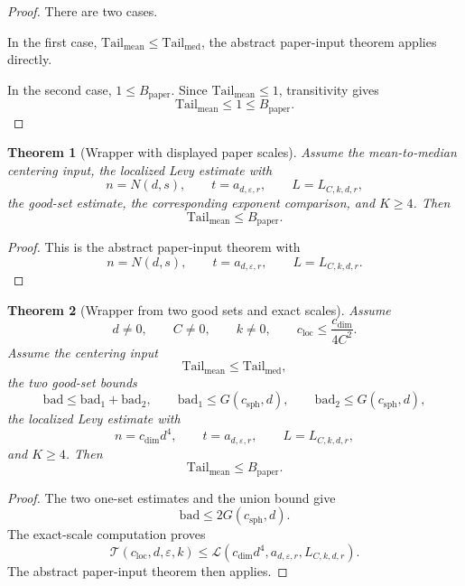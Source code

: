 \documentclass[11pt]{article}
\newtheorem{theorem}{Theorem}[section]
\begin{document}
\begin{proof}
There are two cases.

In the first case,
\(\mathrm{Tail}_{\mathrm{mean}}\le \mathrm{Tail}_{\mathrm{med}}\), the
abstract paper-input theorem applies directly.

In the second case, \(1\le B_{\mathrm{paper}}\).  Since
\(\mathrm{Tail}_{\mathrm{mean}}\le1\), transitivity gives
\[
  \mathrm{Tail}_{\mathrm{mean}}\le1\le B_{\mathrm{paper}}.
\]
\end{proof}

\begin{theorem}[Wrapper with displayed paper scales]
Assume the mean-to-median centering input, the localized Levy estimate with
\[
 n=N(d,s),\qquad
 t=a_{d,\varepsilon,r},\qquad
 L=L_{C,k,d,r},
\]
the good-set estimate, the corresponding exponent comparison, and \(K\ge4\).
Then
\[
 \mathrm{Tail}_{\mathrm{mean}}
 \le
 B_{\mathrm{paper}}.
\]
\end{theorem}

\begin{proof}
This is the abstract paper-input theorem with
\[
 n=N(d,s),\qquad
 t=a_{d,\varepsilon,r},\qquad
 L=L_{C,k,d,r}.
\]
\end{proof}

\begin{theorem}[Wrapper from two good sets and exact scales]
Assume
\[
 d\ne0,\qquad C\ne0,\qquad k\ne0,\qquad
 c_{\mathrm{loc}}\le \frac{c_{\mathrm{dim}}}{4C^2}.
\]
Assume the centering input
\[
 \mathrm{Tail}_{\mathrm{mean}}\le \mathrm{Tail}_{\mathrm{med}},
\]
the two good-set bounds
\[
 \mathrm{bad}\le \mathrm{bad}_1+\mathrm{bad}_2,\qquad
 \mathrm{bad}_1\le G(c_{\mathrm{sph}},d),\qquad
 \mathrm{bad}_2\le G(c_{\mathrm{sph}},d),
\]
the localized Levy estimate with
\[
 n=c_{\mathrm{dim}}d^4,\qquad
 t=a_{d,\varepsilon,r},\qquad
 L=L_{C,k,d,r},
\]
and \(K\ge4\).  Then
\[
 \mathrm{Tail}_{\mathrm{mean}}\le B_{\mathrm{paper}}.
\]
\end{theorem}

\begin{proof}
The two one-set estimates and the union bound give
\[
  \mathrm{bad}\le 2G(c_{\mathrm{sph}},d).
\]
The exact-scale computation proves
\[
 \mathcal T(c_{\mathrm{loc}},d,\varepsilon,k)
 \le
 \mathcal L(c_{\mathrm{dim}}d^4,a_{d,\varepsilon,r},L_{C,k,d,r}).
\]
The abstract paper-input theorem then applies.
\end{proof}
\end{document}
